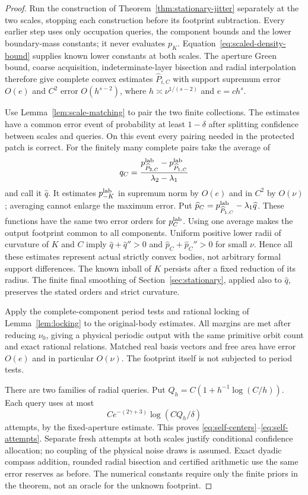 \begin{proof}
Run the construction of Theorem~\ref{thm:stationary-jitter} separately
at the two scales, stopping each construction before its footprint
subtraction. Every earlier step uses only occupation queries, the
component bounds and the lower boundary-mass constants; it never evaluates
$p_K$. Equation~\eqref{eq:scaled-density-bound} supplies known lower
constants at both scales. The aperture Green bound, coarse acquisition,
indeterminate-layer bisection and radial interpolation therefore give
complete convex estimates $\widehat P_{i,C}$ with support supremum
error $O(e)$ and $C^2$ error $O(h^{s-2})$, where
$h\asymp\nu^{1/(s-2)}$ and $e=c h^s$.

Use Lemma~\ref{lem:scale-matching} to pair the two finite collections.
The estimates have a common error event of probability at least
$1-\delta$ after splitting confidence between scales and queries.
On this event every pairing needed in the protected patch is correct.
For the finitely many complete pairs take the average of
\[
 q_C=\frac{p_{\widehat P_{2,C}}^{\rm lab}
                 -p_{\widehat P_{1,C}}^{\rm lab}}{\lambda_2-\lambda_1}
\]
and call it $\widehat q$. It estimates $p_{-K}^{\rm lab}$ in supremum
norm by $O(e)$ and in $C^2$ by $O(\nu)$; averaging cannot enlarge
the maximum error. Put
$\widehat p_C=p_{\widehat P_{1,C}}^{\rm lab}-\lambda_1\widehat q$.
These functions have the same two error orders for $p_C^{\rm lab}$.
Using one average makes the output footprint common to all components.
Uniform positive lower radii of curvature of $K$ and $C$ imply
$\widehat q+\widehat q''>0$ and
$\widehat p_C+\widehat p_C''>0$ for small $\nu$. Hence all these
estimates represent actual strictly convex bodies, not arbitrary formal
support differences. The known inball of $K$ persists after a fixed
reduction of its radius. The finite final smoothing of
Section~\ref{sec:stationary}, applied also to $\widehat q$, preserves
the stated orders and strict curvature.

Apply the complete-component period tests and rational locking of Lemma~\ref{lem:locking}
to the original-body estimates. All margins are met after reducing
$\nu_0$, giving a physical periodic output with the same primitive orbit
count and exact rational relations. Matched real basis vectors and free
area have error $O(e)$ and in particular $O(\nu)$. The footprint itself
is not subjected to period tests.

There are two families of radial queries. Put
$Q_h=C(1+h^{-1}\log(C/h))$. Each query uses at most
\[
                   C e^{-(2\gamma+3)}\log(CQ_h/\delta)
\]
attempts, by the fixed-aperture estimate. This proves
\eqref{eq:self-centers}--\eqref{eq:self-attempts}. Separate fresh
attempts at both scales justify conditional confidence allocation; no
coupling of the physical noise draws is assumed. Exact dyadic compass
addition, rounded radial bisection and certified arithmetic use the same
error reserves as before. The numerical constants require only the
finite priors in the theorem, not an oracle for the unknown footprint.
\end{proof}

